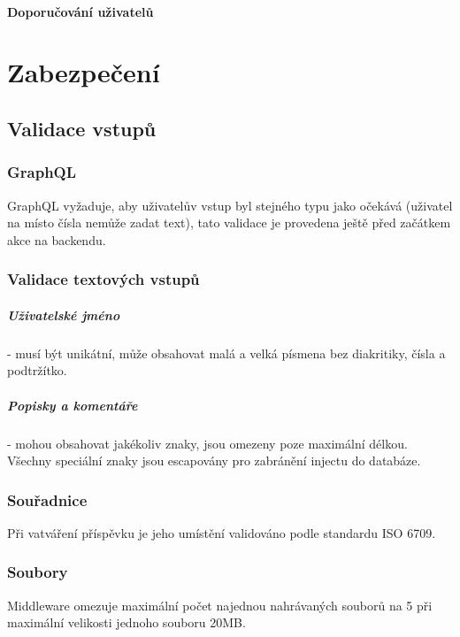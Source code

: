 \documentclass[12pt, a4paper,
 twoside,        %
 openright
]{report}
\begin{document}
        \subsubsection{Doporučování uživatelů}

\chapter{Zabezpečení}
\section{Validace vstupů}
\subsection{GraphQL}
GraphQL vyžaduje, aby uživatelův vstup byl stejného typu jako očekává (uživatel na místo čísla nemůže zadat text), tato validace je provedena ještě před začátkem akce na backendu. 
\subsection{Validace textových vstupů}
\paragraph{Uživatelské jméno} - musí být unikátní, může obsahovat malá a velká písmena bez diakritiky, čísla a podtržítko.
\paragraph{Popisky a komentáře} - mohou obsahovat jakékoliv znaky, jsou omezeny poze maximální délkou. Všechny speciální znaky jsou escapovány pro zabránění injectu do databáze.
\subsection{Souřadnice} Při vatváření příspěvku je jeho umístění validováno podle standardu ISO 6709.
\subsection{Soubory} Middleware omezuje maximální počet najednou nahrávaných souborů na 5 při maximální velikosti jednoho souboru 20MB.
\end{document}
